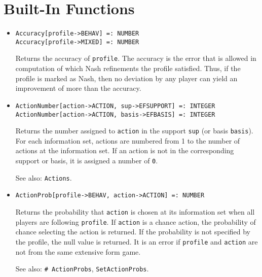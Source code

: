 \section{Built-In Functions}

\begin{itemize}




\item{}
\protect \large \begin{verbatim}
Accuracy[profile->BEHAV] =: NUMBER
Accuracy[profile->MIXED] =: NUMBER
\end{verbatim}\normalsize

\bd 
Returns the accuracy of \verb+profile+.  The accuracy is the error
that is allowed in computation of which Nash refinements the profile
satisfied.  Thus, if the profile is marked as Nash, then no deviation
by any player can yield an improvement of more than the accuracy.  
\ed

\item{}
\protect \large \begin{verbatim}
ActionNumber[action->ACTION, sup->EFSUPPORT] =: INTEGER 
ActionNumber[action->ACTION, basis->EFBASIS] =: INTEGER
\end{verbatim}\normalsize

\bd
Returns the number
assigned to \verb+action+ in the support \verb+sup+ (or basis
\verb+basis+).  For each information set, actions are numbered from 1
to the number of actions at the information set.  If an action is not
in the corresponding support or basis, it is assigned a number of \verb+0+.  

\item [See also:] \verb+Actions+.
\ed

\item{}
\protect \large \begin{verbatim}
ActionProb[profile->BEHAV, action->ACTION] =: NUMBER 
\end{verbatim}\normalsize

\bd
Returns the probability that \verb+action+ is chosen at its
information set when all players are following \verb+profile+.
If \verb+action+ is a chance action, the probability of chance selecting
the action is returned.  If the probability is not specified by the 
profile, the null value is returned.  It is an error if \verb+profile+
and \verb+action+ are not from the same extensive form game.

\item [See also:] \verb+# ActionProbs+, \verb+SetActionProbs+.
\ed


\end{itemize}
